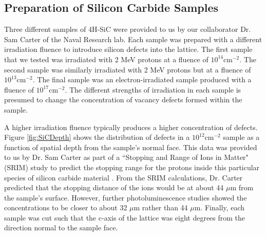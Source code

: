 \documentclass[oneside, astronomy, noacknowlegments]{BYUPhys}
\begin{document}
\subsection{Preparation of Silicon Carbide Samples}
\label{sec:SiCSamples}

Three different samples of 4H-SiC were provided to us by our collaborator Dr. Sam Carter of the Naval Research lab. Each sample was prepared with a different irradiation fluence to introduce silicon defects into the lattice. The first sample that we tested was irradiated with 2 MeV protons at a fluence of $10^{14} \text{cm}^{-2}$. The second sample was similarly irradiated with 2 MeV protons but at a fluence of $10^{13} \text{cm}^{-2}$. The final sample was an electron-irradiated sample produced with a fluence of $10^{17} \text{cm}^{-2}$. The different strengths of irradiation in each sample is presumed to change the concentration of vacancy defects formed within the sample.

A higher irradiation fluence typically produces a higher concentration of defects. Figure \ref{fig:SiCDepth} shows the distribution of defects in a $10^{12} \text{cm}^{-2}$ sample as a function of spatial depth from the sample's normal face. This data was provided to us by Dr. Sam Carter as part of a ``Stopping and Range of Ions in Matter" (SRIM) study to predict the stopping range for the protons inside this particular species of silicon carbide material \cite{RefWorks:doc:5892964ee4b0499fa95c5108}. From the SRIM calculations, Dr. Carter predicted that the stopping distance of the ions would be at about 44 $\mu$m from the sample's surface. However, further photoluminescence studies showed the concentrations to be closer to about 32 $\mu$m rather than 44 $\mu$m. Finally, each sample was cut such that the c-axis of the lattice was eight degrees from the direction normal to the sample face.
    
\end{document}
